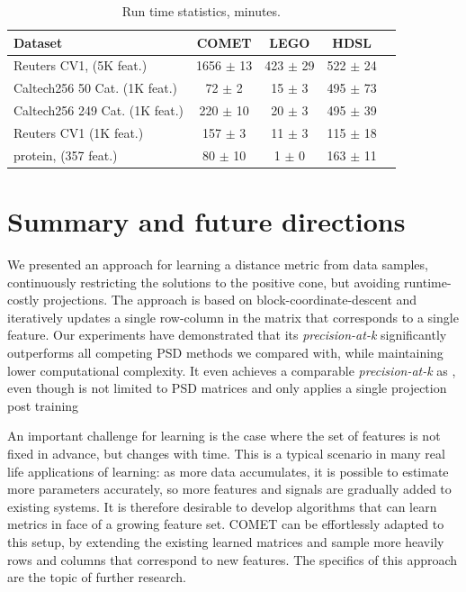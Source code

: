 \documentclass{article} %
\begin{document}
\begin{table}[t]
\caption{Run time statistics, minutes.}
\label{runtimes}
\vskip 0.15in
\begin{center}
\begin{small}
\begin{sc}
\begin{tabular}{lcccr}
\hline
Dataset     & COMET           & LEGO            & HDSL             \\ 
\hline
Reuters CV1, (5K feat.)&  1656 $\pm$    13 &   423 $\pm$    29 &   522 $\pm$    24  \\ 
Caltech256 50 Cat. (1K feat.)  &    72 $\pm$     2 &    15 $\pm$     3 &   495 $\pm$    73  \\ 
Caltech256 249 Cat. (1K feat.) &   220 $\pm$    10 &    20 $\pm$     3 &  495 $\pm$    39   \\
Reuters CV1 (1K feat.) &   157 $\pm$     3 &    11 $\pm$     3 &   115 $\pm$    18  \\ 
protein, (357 feat.)  &    80 $\pm$    10 &     1 $\pm$     0 &   163 $\pm$    11 \\ 
\hline
\end{tabular}
\end{sc}
\end{small}
\end{center}
\vskip -0.1in
\end{table}

\section{Summary and future directions}
We presented an approach for learning a distance metric from data samples, continuously restricting the solutions to the positive cone, but avoiding runtime-costly projections. The approach is based on block-coordinate-descent and iteratively updates a single row-column in the matrix that corresponds to a single feature. Our experiments have demonstrated that its \textit{precision-at-k} significantly outperforms all competing PSD methods we compared with, while maintaining lower computational complexity. It even achieves a comparable \textit{precision-at-k} as \cite{OASIS}, even though \cite{OASIS} is not limited to PSD matrices and only applies a single projection post training

An important challenge for learning is the case where the set of features is not fixed in advance, but changes with time. This is a typical scenario in many real life applications of learning: as more data accumulates, it is possible to estimate more parameters accurately, so more features and signals are gradually added to existing systems. It is therefore desirable to develop algorithms that can learn metrics in face of a growing feature set. COMET can be effortlessly adapted to this setup, by extending the existing learned matrices and sample more heavily rows and columns that correspond to new features. The specifics of this approach are the topic of further research.


\newpage

\small{

%
}
\end{document}
